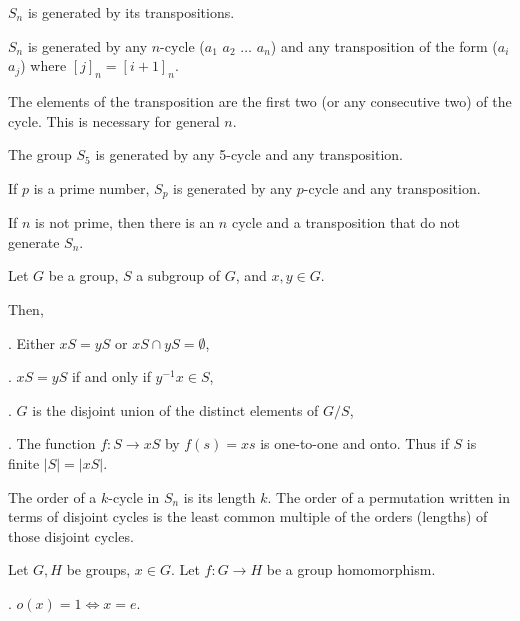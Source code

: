 \documentclass{article}
\newcommand\inv{^{-1}}
\begin{document}

$S_n$ is generated by its transpositions.


$S_n$ is generated by any $n$-cycle ($a_1$ $a_2$ $\hdots$ $a_n$) and any transposition of the form ($a_i$ $a_j$) where $[j]_n=[i+1]_n$.

The elements of the transposition are the first two (or any consecutive two) of the cycle. This is necessary for general $n$.


The group $S_5$ is generated by any 5-cycle and any transposition.


If $p$ is a prime number, $S_p$ is generated by any $p$-cycle and any transposition.

If $n$ is not prime, then there is an $n$ cycle and a transposition that do not generate $S_n$.



\newpage
{}

Let $G$ be a group, $S$ a subgroup of $G$, and $x,y\in G$.

Then,

\indent{}. Either $xS=yS$ or $xS\cap yS = \emptyset$,

\indent{}. $xS=yS$ if and only if $y\inv x \in S$,

\indent{}. $G$ is the disjoint union of the distinct elements of $G/S$,

\indent{}. The function $f:S\to xS$ by $f(s)=xs$ is one-to-one and onto. Thus if $S$ is finite $|S|=|xS|$.

\newpage


The order of a $k$-cycle in $S_n$ is its length $k$. The order of a permutation written in terms of disjoint cycles is the least common multiple of the orders (lengths) of those disjoint cycles.


Let $G,H$ be groups, $x\in G$. Let $f:G\to H$ be a group homomorphism.

\indent{}. $o(x)=1 \iff x=e$. 
\end{document}
